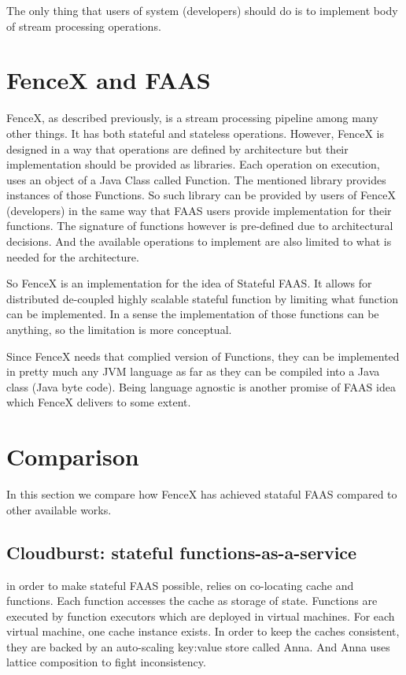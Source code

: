 \documentclass[a4]{report}
\begin{document}
        The only thing that users of system (developers) should do is to implement body of stream processing operations.

        \section{FenceX and FAAS}
        FenceX, as described previously, is a stream processing pipeline among many other things.
        It has both stateful and stateless operations.
        However, FenceX is designed in a way that operations are defined by architecture but their implementation should
        be provided as libraries.
        Each operation on execution, uses an object of a Java Class called Function.
        The mentioned library provides instances of those Functions.
        So such library can be provided by users of FenceX (developers) in the same way that FAAS users provide
        implementation for their functions.
        The signature of functions however is pre-defined due to architectural decisions.
        And the available operations to implement are also limited to what is needed for the architecture.

        So FenceX is an implementation for the idea of Stateful FAAS.
        It allows for distributed de-coupled highly scalable stateful function by limiting what function can be implemented.
        In a sense the implementation of those functions can be anything, so the limitation is more conceptual.

        Since FenceX needs that complied version of Functions, they can be implemented in pretty much any JVM language as
        far as they can be compiled into a Java class (Java byte code).
        Being language agnostic is another promise of FAAS idea which FenceX delivers to some extent.

        \section{Comparison}
        In this section we compare how FenceX has achieved stataful FAAS compared to other available works.
        \subsection{Cloudburst: stateful functions-as-a-service \cite{Functions-as-a-Service-2020}}
        \cite{Functions-as-a-Service-2020} in order to make stateful FAAS possible, relies on co-locating cache and
        functions.
        Each function accesses the cache as storage of state.
        Functions are executed by function executors which are deployed in virtual machines.
        For each virtual machine, one cache instance exists.
        In order to keep the caches consistent, they are backed by an auto-scaling key:value store called Anna.
        And Anna uses lattice composition to fight inconsistency.
\end{document}
